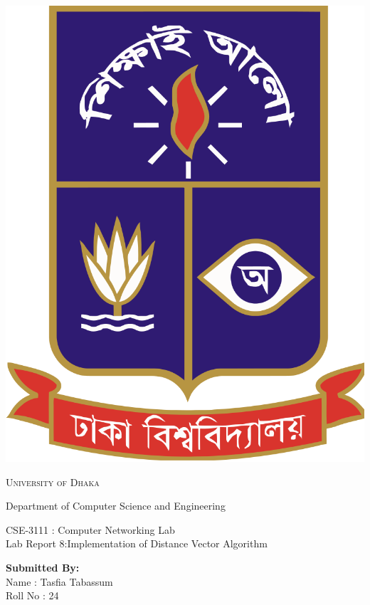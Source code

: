 \documentclass[11pt]{article}
\begin{document}
\begin{titlepage}
	\begin{center}
    	\includegraphics[scale=0.10]{du.png}\par
		\begin{Huge}
			\textsc{University of Dhaka}\par
		\end{Huge}
		\begin{Large}
			Department of Computer Science and Engineering\par \vspace{.5cm}
			CSE-3111 : Computer Networking Lab \\[12pt]	
			Lab Report 8:Implementation of Distance Vector Algorithm
		\end{Large}
	\end{center}  	
	\begin{large}
		\textbf{Submitted By:\\[12pt]}
			Name : Tasfia Tabassum\\[8pt]
			Roll No : 24\\[12pt]

\end{large}
\end{titlepage}
\end{document}
